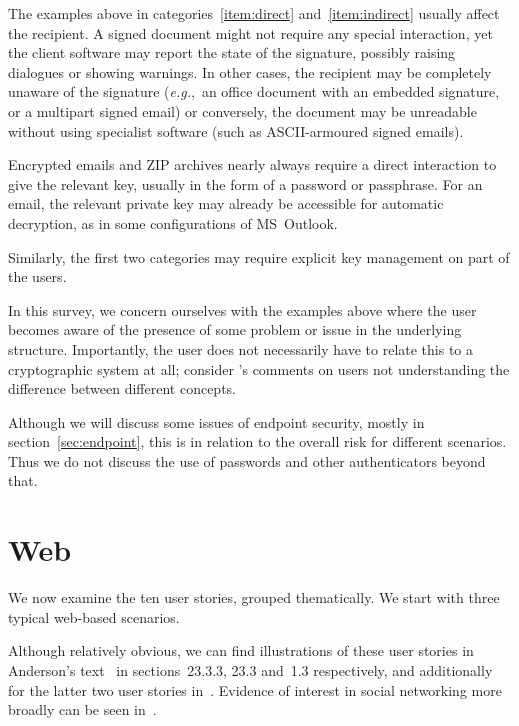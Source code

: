 \documentclass{article}
\def\citeN{\citet}
\newcommand{\eg}{\textit{e.g.}}
\newenvironment{userstories}{\begin{description}}{\end{description}}
\begin{document}
The examples above in categories~\ref{item:direct} and~\ref{item:indirect} usually affect the recipient.  A signed document
might not require any special interaction, yet the client software may
report the state of the signature, possibly raising dialogues or
showing warnings.  In other cases, the recipient may be completely
unaware of the signature (\eg,~an office document with an embedded
signature, or a multipart signed email) or conversely, the document
may be unreadable without using specialist software (such as
ASCII-armoured signed emails).  

Encrypted emails and ZIP archives
nearly always require a direct interaction to give the relevant key,
usually in the form of a password or passphrase.  For an email, the
relevant private key may already be accessible for automatic
decryption, as in some configurations of MS~Outlook.

Similarly, the first two categories may require explicit key management on part of the users.

In this survey, we concern ourselves with the examples above where the user becomes
aware of the presence of some problem or issue in the underlying structure.  
Importantly, the user does not  necessarily have to  relate this to a cryptographic system at all; consider \citeN{Ho+10}'s comments on users not understanding the difference between different concepts.  

Although we will discuss some issues of endpoint security, mostly in section~\ref{sec:endpoint}, this is in relation to the overall risk for different scenarios.  Thus we do not discuss the use of passwords and other authenticators beyond that.


\section{Web}\label{sec:web}
We now examine the ten user stories, grouped thematically.
We start with three typical web-based scenarios.

\begin{userstories}
\USAwsocial
\USAwecommerce
\USAwbanking
\end{userstories}
Although relatively obvious, we can find illustrations of these user
stories in Anderson's text~\citeyear{Anderson08} in sections~23.3.3,
23.3 and~1.3 respectively, and additionally for the latter two user
stories in~\citeN{Cronin97}.  Evidence of interest in social
networking more broadly can be seen in~\citeN{mSocialnets09}.
\end{document}
